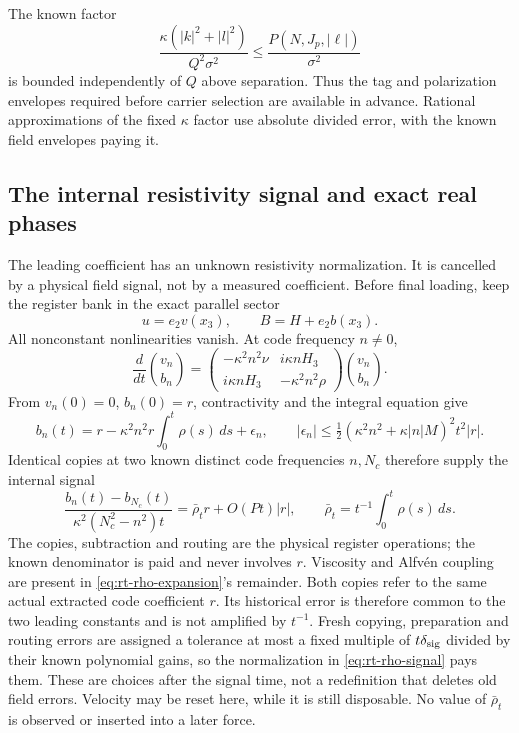 \documentclass[11pt,a4paper]{amsart}
\theoremstyle{definition}
\theoremstyle{remark}
\numberwithin{equation}{section}
\begin{document}
The known factor
\begin{equation}\label{eq:rt-normalizer-bound}
 \frac{\kappa(|k|^2+|l|^2)}{Q^2\sigma^2}
 \le \frac{P(N,J_p,|\ell|)}{\sigma^2}
\end{equation}
is bounded independently of $Q$ above separation.  Thus the tag and
polarization envelopes required before carrier selection are available
in advance.  Rational approximations of the fixed $\kappa$ factor use
absolute divided error, with the known field envelopes paying it.

\subsection{The internal resistivity signal and exact real phases}
The leading coefficient has an unknown resistivity normalization.  It is
cancelled by a physical field signal, not by a measured coefficient.
Before final loading, keep the register bank in the exact parallel sector
\begin{equation}\label{eq:rt-rho-sector}
 u=e_2v(x_3),\qquad B=H+e_2b(x_3).
\end{equation}
All nonconstant nonlinearities vanish.  At code frequency $n\ne0$,
\[
 \frac d{dt}\binom{v_n}{b_n}
 =\begin{pmatrix}-\kappa^2n^2\nu&i\kappa nH_3\\
                 i\kappa nH_3&-\kappa^2n^2\rho\end{pmatrix}
                     \binom{v_n}{b_n}.
\]
From $v_n(0)=0$, $b_n(0)=r$, contractivity and the integral equation give
\begin{equation}\label{eq:rt-rho-expansion}
 b_n(t)=r-\kappa^2n^2r\int_0^t\rho(s)\,ds+\epsilon_n,
 \qquad |\epsilon_n|\le\tfrac12
       (\kappa^2n^2+\kappa|n|M)^2t^2|r|.
\end{equation}
Identical copies at two known distinct code frequencies $n,N_c$ therefore
supply the internal signal
\begin{equation}\label{eq:rt-rho-signal}
 \frac{b_n(t)-b_{N_c}(t)}{\kappa^2(N_c^2-n^2)t}
       =\bar\rho_t r+O(Pt)|r|,
 \qquad\bar\rho_t=t^{-1}\int_0^t\rho(s)\,ds.
\end{equation}
The copies, subtraction and routing are the physical register operations;
the known denominator is paid and never involves $r$.  Viscosity and
Alfv\'en coupling are present in \eqref{eq:rt-rho-expansion}'s remainder.
Both copies refer to the same actual extracted code coefficient $r$.
Its historical error is therefore common to the two leading constants
and is not amplified by $t^{-1}$.  Fresh copying, preparation and routing
errors are assigned a tolerance at most a fixed multiple of
$t\delta_{\rm sig}$ divided by their known polynomial gains, so the
normalization in \eqref{eq:rt-rho-signal} pays them.  These are choices
after the signal time, not a redefinition that deletes old field errors.
Velocity may be reset here, while it is still disposable.  No value of
$\bar\rho_t$ is observed or inserted into a later force.
\end{document}
